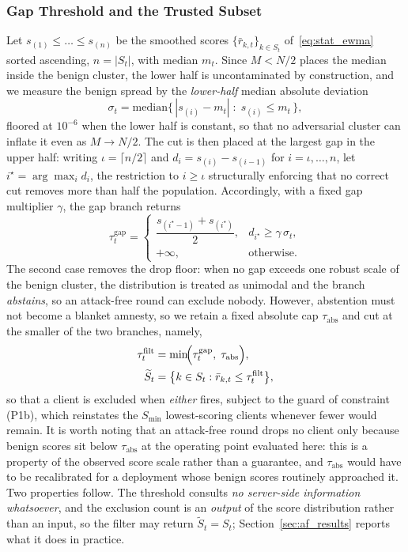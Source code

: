 \documentclass[journal]{IEEEtran}
\begin{document}
\subsubsection{Gap Threshold and the Trusted Subset}
Let $s_{(1)} \le \dots \le s_{(n)}$ be the smoothed scores $\{\bar r_{k,t}\}_{k \in S_t}$ of~\eqref{eq:stat_ewma} sorted ascending, $n = |S_t|$, with median $m_t$. Since $M < N/2$ places the median inside the benign cluster, the lower half is uncontaminated by construction, and we measure the benign spread by the \emph{lower-half} median absolute deviation
\begin{equation}
\sigma_t = \mathrm{median}\bigl\{\,|s_{(i)} - m_t| \;:\; s_{(i)} \le m_t \,\bigr\},
\label{eq:benign_scale}
\end{equation}
floored at $10^{-6}$ when the lower half is constant, so that no adversarial cluster can inflate it even as $M \to N/2$. The cut is then placed at the largest gap in the upper half: writing $\iota = \lceil n/2 \rceil$ and $d_i = s_{(i)} - s_{(i-1)}$ for $i = \iota, \dots, n$, let $i^\star = \arg\max_i d_i$, the restriction to $i \ge \iota$ structurally enforcing that no correct cut removes more than half the population. Accordingly, with a fixed gap multiplier $\gamma$, the gap branch returns
\begin{equation}
\tau_t^{\mathrm{gap}} = \begin{cases} \dfrac{s_{(i^\star - 1)} + s_{(i^\star)}}{2}, & d_{i^\star} \ge \gamma\,\sigma_t,\\[1.5ex] +\infty, & \text{otherwise}.\end{cases}
\label{eq:gap_threshold}
\end{equation}
The second case removes the drop floor: when no gap exceeds one robust scale of the benign cluster, the distribution is treated as unimodal and the branch \emph{abstains}, so an attack-free round can exclude nobody. However, abstention must not become a blanket amnesty, so we retain a fixed absolute cap $\tau_{\mathrm{abs}}$ and cut at the smaller of the two branches, namely,
\begin{align}
\tau_t^{\mathrm{filt}} &= \min\!\Bigl(\tau_t^{\mathrm{gap}},\; \tau_{\mathrm{abs}}\Bigr), \label{eq:dual_thresh}\\
\widetilde{S}_t &= \bigl\{k \in S_t : \bar r_{k,t} \le \tau_t^{\mathrm{filt}}\bigr\}, \label{eq:filtered_set}
\end{align}
so that a client is excluded when \emph{either} fires, subject to the guard of constraint (P1b), which reinstates the $S_{\min}$ lowest-scoring clients whenever fewer would remain. It is worth noting that an attack-free round drops no client only because benign scores sit below $\tau_{\mathrm{abs}}$ at the operating point evaluated here: this is a property of the observed score scale rather than a guarantee, and $\tau_{\mathrm{abs}}$ would have to be recalibrated for a deployment whose benign scores routinely approached it. Two properties follow. The threshold consults \emph{no server-side information whatsoever}, and the exclusion count is an \emph{output} of the score distribution rather than an input, so the filter may return $\widetilde{S}_t = S_t$; Section~\ref{sec:af_results} reports what it does in practice.
\end{document}
